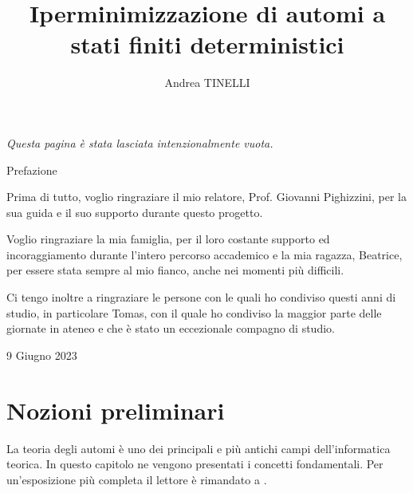 \documentclass[a4paper,12pt,twoside, openright]{report} %
\begin{document}


\title{Iperminimizzazione di automi a stati finiti deterministici}
\author{Andrea TINELLI}



\beforepreface
\prefacesection{}
{\hfill {\sl Questa pagina è stata lasciata intenzionalmente vuota.}}



Prefazione



Prima di tutto, voglio ringraziare il mio relatore, Prof. Giovanni Pighizzini,
per la sua guida e il suo supporto durante questo progetto.

Voglio ringraziare la mia famiglia, per il loro costante supporto ed incoraggiamento
durante l'intero percorso accademico e la mia ragazza, Beatrice, per essere stata sempre al mio fianco,
anche nei momenti più difficili.

Ci tengo inoltre a ringraziare le persone con le quali ho condiviso questi anni di studio, in particolare
Tomas, con il quale ho condiviso la maggior parte delle giornate in ateneo e che è stato un eccezionale
compagno di studio.

\hfill 9 Giugno 2023


\afterpreface


\chapter{Nozioni preliminari}
\label{cap1}

La teoria degli automi è uno dei principali e più antichi campi dell'informatica teorica. In questo capitolo
ne vengono presentati i concetti fondamentali. Per un'esposizione più completa il lettore è rimandato a \parencite{HMU06}.
\end{document}
